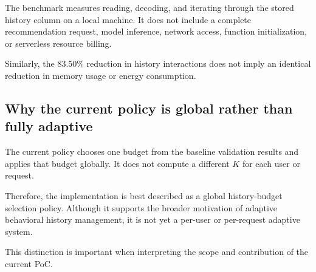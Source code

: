 \documentclass[11pt,a4paper]{article}
\begin{document}
The benchmark measures reading, decoding, and iterating through the stored history column on a local machine. It does not include a complete recommendation request, model inference, network access, function initialization, or serverless resource billing.

Similarly, the 83.50\% reduction in history interactions does not imply an identical reduction in memory usage or energy consumption.

\subsection{Why the current policy is global rather than fully adaptive}
The current policy chooses one budget from the baseline validation results and applies that budget globally. It does not compute a different $K$ for each user or request.

Therefore, the implementation is best described as a global history-budget selection policy. Although it supports the broader motivation of adaptive behavioral history management, it is not yet a per-user or per-request adaptive system.

This distinction is important when interpreting the scope and contribution of the current PoC.
\end{document}
